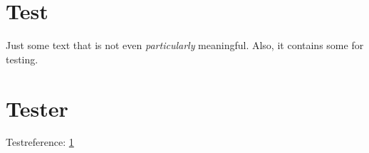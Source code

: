 \documentclass[a4paper,fleqn]{article}
\begin{document}
\tableofcontents

\section{Test}
\label{sec:test}
Just some text that is not even \emph{particularly} meaningful.
Also, it contains some \errors for testing.

\section{Tester}
Testreference: \ref{sec:test}
\end{document}
